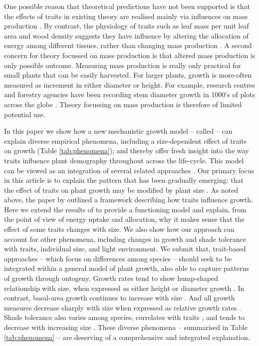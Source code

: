 \documentclass[a4paper,11pt]{article}
\begin{document}
One possible reason that theoretical predictions have not been supported is that the effects of traits in existing theory are realised mainly via influences on mass production \citep{Enquist-2007}. By contrast, the physiology of traits such as leaf mass per unit leaf area and wood density suggests they have influence by altering the allocation of energy among different tissues, rather than changing mass production \citep{Falster-2011, Gibert-2016}. A second concern for theory focussed on mass production is that altered mass production is only possible outcome. Measuring mass production is really only practical for small plants that can be easily harvested. For larger plants, growth is more-often measured as increment in either diameter or height. For example, research centres and forestry agencies have been recording stem diameter growth in 1000's of plots across the globe \citep{Purves-2008, Anderson-2015, Kunstler-2016}. Theory focussing on mass production is therefore of limited potential use.


In this paper we show how a new mechanistic growth model -- called {\plant} \citep{Falster-2016} -- can explain diverse empirical phenomena, including a size-dependent effect of traits on growth (Table \ref{tab:phenomena}); and thereby offer fresh insight into the way traits influence plant demography throughout across the life-cycle. This model can be viewed as an integration of several related approaches \citep[e.g.][]{Givnish-1988, Yokozawa-1995,Makela-1997, Moorcroft-2001, Sitch-2008, Falster-2011, King-2011}. Our primary focus in this article is to explain the pattern that has been gradually emerging: that the effect of traits on plant growth may be modified by plant size \citep{Ruger-2012, Iida-2014, Gibert-2016}. As noted above, the paper by \citet{Gibert-2016} outlined a framework describing how traits influence growth. Here we extend the results of \citet{Gibert-2016} to provide a functioning model and explain, from the point of view of energy uptake and allocation, why it makes sense that the effect of some traits changes with size. We also show how our approach can account for other phenomena, including changes in growth and shade tolerance with traits, individual size, and light environment. We submit that, trait-based approaches -- which focus on differences among species -- should seek to be integrated within a general model of plant growth, also able to capture patterns of growth through ontogeny. Growth rates tend to show hump-shaped relationship with size, when expressed as either height \citep{Sillett-2010, King-2011} or diameter growth \citep{Herault-2011}. In contrast, basal-area growth continues to increase with size \citep{Sillett-2010, Stephenson-2014}. And all growth measures decrease sharply with size when expressed as relative growth rates \citep{Rees-2010, Iida-2014}. Shade tolerance also varies among species, correlates with traits \citep{Lusk-2008,Poorter-2006}, and tends to decrease with increasing size \citep{Givnish-1988, Lusk-2008}. These diverse phenomena -- summarised in Table \ref{tab:phenomena} -- are deserving of a comprehensive and integrated explanation.
\end{document}
